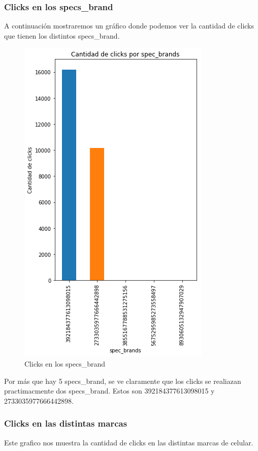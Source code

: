 \documentclass[a4paper, 12pt]{article}
\newcommand\tab[1][1cm]{\hspace*{#1}}
\begin{document}
	\subsubsection{Clicks en los specs\_brand}
		\tab A continuación mostraremos un gráfico donde podemos ver la cantidad de clicks que tienen los distintos specs\_brand.

		\FloatBarrier
		\begin{figure}[h]
			\centering
			\includegraphics[scale = 0.7]{images/clicks/clicks_specs_brand.png}
			\caption{Clicks en los specs\_brand}
		\end{figure}
		\FloatBarrier

		\tab Por más que hay 5 specs\_brand, se ve claramente que los clicks se realiazan practimacmente dos specs\_brand. Estos son 392184377613098015 y 2733035977666442898.
		

	\subsubsection{Clicks en las distintas marcas}
		\tab Este grafico nos muestra la cantidad de clicks en las distintas marcas de celular.
\end{document}
